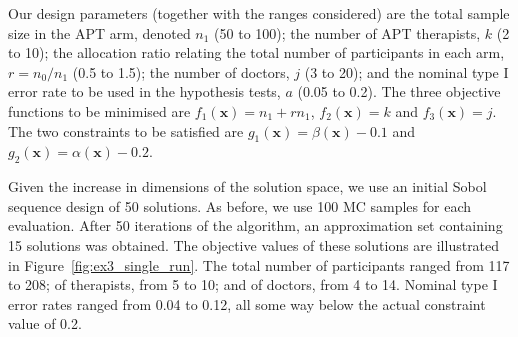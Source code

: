 \documentclass[]{sagej}
\begin{document}
Our design parameters (together with the ranges considered) are the total sample size in the APT arm, denoted $n_1$ (50 to 100); the number of APT therapists, $k$ (2 to 10); the allocation ratio relating the total number of participants in each arm, $r = n_0/n_1$ (0.5 to 1.5); the number of doctors, $j$ (3 to 20); and the nominal type I error rate to be used in the hypothesis tests, $a$ (0.05 to 0.2). The three objective functions to be minimised are $f_{1}(\mathbf{x}) = n_1 + rn_1$, $f_{2}(\mathbf{x}) = k$ and $f_{3}(\mathbf{x}) = j$. The two constraints to be satisfied are $g_{1}(\mathbf{x}) = \beta(\mathbf{x}) - 0.1$ and $g_{2}(\mathbf{x}) = \alpha(\mathbf{x}) - 0.2$.

Given the increase in dimensions of the solution space, we use an initial Sobol sequence design of 50 solutions. As before, we use 100 MC samples for each evaluation. After 50 iterations of the algorithm, an approximation set containing 15 solutions was obtained. The objective values of these solutions are illustrated in Figure~\ref{fig:ex3_single_run}. The total number of participants ranged from 117 to 208; of therapists, from 5 to 10; and of doctors, from 4 to 14. Nominal type I error rates ranged from 0.04 to 0.12, all some way below the actual constraint value of 0.2.

\end{document}
